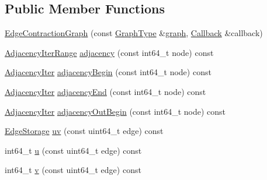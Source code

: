 \subsection*{Public Member Functions}
\begin{DoxyCompactItemize}
\item 
\hyperlink{classnifty_1_1graph_1_1EdgeContractionGraph_a4c8a53ef17ec713e184518364295bf01}{Edge\+Contraction\+Graph} (const \hyperlink{classnifty_1_1graph_1_1EdgeContractionGraph_a67f653761dbc2c203891b041aacc3f04}{Graph\+Type} \&\hyperlink{classnifty_1_1graph_1_1EdgeContractionGraph_a422ab3344774fa68583658effa1fca95}{graph}, \hyperlink{classnifty_1_1graph_1_1EdgeContractionGraph_a75e91e51c78d2f427a31c30dcd8996ed}{Callback} \&callback)
\item 
\hyperlink{structnifty_1_1graph_1_1EdgeContractionGraph_1_1AdjacencyIterRange}{Adjacency\+Iter\+Range} \hyperlink{classnifty_1_1graph_1_1EdgeContractionGraph_a304b4afa030620170b93269c0f9211ca}{adjacency} (const int64\+\_\+t node) const
\item 
\hyperlink{classnifty_1_1graph_1_1EdgeContractionGraph_a447212f5ced0c4ef4d304e8b89f4f200}{Adjacency\+Iter} \hyperlink{classnifty_1_1graph_1_1EdgeContractionGraph_a687e27cdcc7aef855c05c3444d6af5dc}{adjacency\+Begin} (const int64\+\_\+t node) const
\item 
\hyperlink{classnifty_1_1graph_1_1EdgeContractionGraph_a447212f5ced0c4ef4d304e8b89f4f200}{Adjacency\+Iter} \hyperlink{classnifty_1_1graph_1_1EdgeContractionGraph_a07541202609a5f1e66365105354827b5}{adjacency\+End} (const int64\+\_\+t node) const
\item 
\hyperlink{classnifty_1_1graph_1_1EdgeContractionGraph_a447212f5ced0c4ef4d304e8b89f4f200}{Adjacency\+Iter} \hyperlink{classnifty_1_1graph_1_1EdgeContractionGraph_ac852a6bd37df982e507c0ab1319f4bfc}{adjacency\+Out\+Begin} (const int64\+\_\+t node) const
\item 
\hyperlink{classnifty_1_1graph_1_1EdgeContractionGraph_ad57e807f7df20892c7bbbb9b53d3aa08}{Edge\+Storage} \hyperlink{classnifty_1_1graph_1_1EdgeContractionGraph_aa9f877c513e88e0fcb31ea57c0601b82}{uv} (const uint64\+\_\+t edge) const
\item 
int64\+\_\+t \hyperlink{classnifty_1_1graph_1_1EdgeContractionGraph_abcf5091cb2fa0a7ebf70461670f6adc6}{u} (const uint64\+\_\+t edge) const
\item 
int64\+\_\+t \hyperlink{classnifty_1_1graph_1_1EdgeContractionGraph_a454f1714ad453fc12af7b688e1a65083}{v} (const uint64\+\_\+t edge) const
\item 

\end{DoxyCompactItemize}
